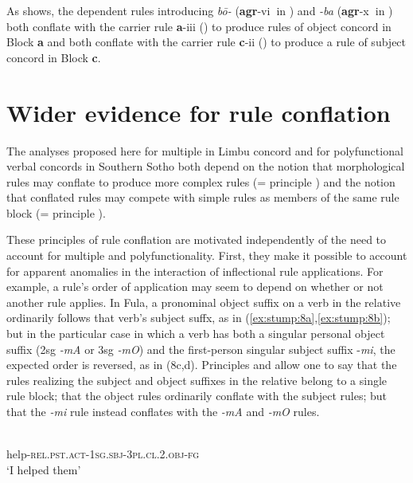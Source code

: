 \documentclass[output=paper,
modfonts
]{LSP/langsci}
\begin{document}
As  shows, the dependent rules introducing \textit{b\=o\nobreakdash-} (\textbf{agr}\nobreakdash-vi\textbf{~}in )\textit{} and \textit{\nobreakdash-ba} (\textbf{agr}\nobreakdash-x\textbf{~}in ) both conflate with the carrier rule \textbf{a}\nobreakdash-iii () to produce rules of object concord in Block \textbf{a} and both conflate with the carrier rule \textbf{c}\nobreakdash-ii () to produce a rule of subject concord in Block \textbf{c}.  

\section{Wider evidence for rule conflation}\label{sec:stump:7}
The analyses proposed here for multiple  in Limbu  concord and for polyfunctional verbal concords in Southern Sotho both depend on the notion that morphological rules may conflate to produce more complex rules (= principle ) and the notion that conflated rules may compete with simple rules as members of the same rule block (= principle ).  

These principles of rule conflation are motivated independently of the need to account for multiple  and polyfunctionality.  First, they make it possible to account for apparent anomalies in the interaction of inflectional rule applications.  For example, a rule’s order of application may seem to depend on whether or not another rule applies. In Fula, a pronominal object suffix on a verb in the relative  ordinarily follows that verb’s subject suffx, as in (\ref{ex:stump:8a},\ref{ex:stump:8b}); but in the particular case in which a verb has both a singular personal object suffix (2sg \textit{\nobreakdash-mA} or 3sg \textit{\nobreakdash-mO}) and the first\nobreakdash-person singular subject suffix \nobreakdash-\textit{mi}, the expected order is reversed, as in (8c,d).  Principles  and  allow one to say that the rules realizing the subject and object suffixes in the relative  belong to a single rule block; that the object rules ordinarily conflate with the subject rules; but that the \textit{\nobreakdash-mi} rule instead conflates with the \textit{\nobreakdash-mA} and \textit{\nobreakdash-mO} rules.  


\ea \label{ex:stump:8}
	\ea \label{ex:stump:8a}
	\\
	{help\nobreakdash-\textsc{rel.pst.act}\textsc{\nobreakdash-1sg.sbj\nobreakdash-3pl.}\textsc{cl.2.obj}\textsc{\nobreakdash-fg}}\\
	\glt `I helped them'
	
\end{document}
